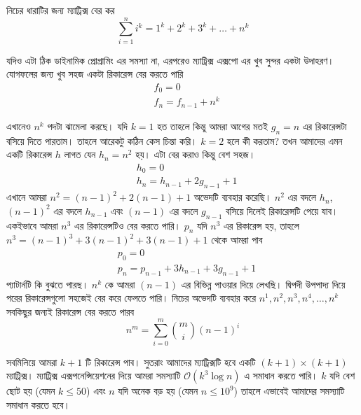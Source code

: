 \begin{problem}
নিচের ধারাটির জন্য ম্যাট্রিক্স বের কর 
$$\sum_{i = 1}^n i^{k} = 1^{k} + 2^{k} + 3^{k}+ \dots + n^{k}$$
\end{problem}

\begin{solution}
যদিও এটা ঠিক ডাইনামিক প্রোগ্রামিং এর সমস্যা না, এরপরেও ম্যাট্রিক্স এক্সপো এর খুব সুন্দর একটা উদাহরণ। যোগফলের জন্য খুব সহজ একটা রিকারেন্স বের করতে পারি 
\begin{align*}
& f_{0} = 0 \\ 
& f_{n} = f_{n - 1} + n^k
\end{align*} 

এখানেও $n^k$ পদটা ঝামেলা করছে। যদি $k = 1$ হত তাহলে কিন্তু আমরা আগের মতই $g_{n} = n$ এর রিকারেন্সটা বসিয়ে দিতে পারতাম। তাহলে আরেকটু কঠিন কেস চিন্তা করি। $k = 2$ হলে কী করতাম? তখন আমাদের এমন একটি রিকারেন্স $h$ লাগত যেন $h_{n} = n^{2}$ হয়। এটা বের করাও কিন্তু বেশ সহজ। 
\begin{align*}
& h_{0} = 0 \\ 
& h_{n} = h_{n - 1} + 2g_{n - 1} + 1
\end{align*}
এখানে আমরা $n^2 = (n - 1)^2 + 2(n - 1) + 1$ অভেদটি ব্যবহার করেছি। $n^2$ এর বদলে $h_{n}$, $(n - 1)^2$ এর বদলে $h_{n - 1}$ এবং $(n - 1)$ এর বদলে $g_{n - 1}$ বসিয়ে দিলেই রিকারেন্সটি পেয়ে যাব। একইভাবে আমরা $n^3$ এর রিকারেন্সটিও বের করতে পারি। $p_{n}$ যদি $n^3$ এর রিকারেন্স হয়, তাহলে $n^3 = (n - 1)^3 + 3(n - 1)^2 + 3(n - 1) + 1$ থেকে আমরা পাব 
\begin{align*}
& p_{0} = 0 \\ 
& p_{n} = p_{n - 1} + 3h_{n - 1} + 3g_{n - 1} + 1
\end{align*}
প্যাটার্নটি কি বুঝতে পারছ। $n^{k}$ কে আমরা $(n - 1)$ এর বিভিন্ন পাওয়ার দিয়ে লেখছি। দ্বিপদী উপপাদ্য দিয়ে পরের রিকারেন্সগুলো সহজেই বের করে ফেলতে পারি। নিচের অভেদটি ব্যবহার করে $n^1, n^2, n^3, n^4, \dots, n^k$ সবকিছুর জন্যই রিকারেন্স বের করতে পারব 
$$n^{m} = \sum_{i = 0}^{m} \binom{m}{i} (n - 1)^i$$

সবমিলিয়ে আমরা $k + 1$ টি রিকারেন্স পাব। সুতরাং আমাদের ম্যাট্রিক্সটি হবে একটি $(k + 1) \times (k + 1)$ ম্যাট্রিক্স। ম্যাট্রিক্স  এক্সপনেন্সিয়েশনের দিয়ে আমরা সমস্যাটি $\mathcal{O}(k^3 \log{n})$ এ সমাধান করতে পারি। $k$ যদি বেশ ছোট হয় (যেমন $k \leq 50$) এবং $n$ যদি অনেক বড় হয় (যেমন $n \leq 10^9$) তাহলে এভাবেই আমাদের সমস্যাটি সমাধান করতে হবে। 
\end{solution}

